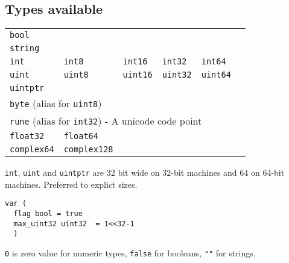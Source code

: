 \subsection{Types available}
\begin{tabular}{l l l l l l}
\multicolumn{6}{l}{\texttt{bool}} \\
\multicolumn{6}{l}{\texttt{string}} \\
\texttt{int} & \texttt{int8} & \texttt{int16} & \texttt{int32} & \texttt{int64} \\
\texttt{uint} & \texttt{uint8} & \texttt{uint16} & \texttt{uint32} & \texttt{uint64} \\
\multicolumn{6}{l}{\texttt{uintptr}} \\
\multicolumn{6}{l}{\texttt{byte} (alias for \texttt{uint8})} \\
\multicolumn{6}{l}{\texttt{rune} (alias for \texttt{int32}) - A unicode code point} \\
\texttt{float32} & \texttt{float64} \\
\texttt{complex64} & \texttt{complex128} \\
\end{tabular}

\texttt{int}, \texttt{uint} and \texttt{uintptr} are 32 bit wide on 32-bit machines and 64 on 64-bit machines. Preferred to explict sizes.

\begin{lstlisting}
var (
  flag bool = true
  max_uint32 uint32  = 1<<32-1 
  )
\end{lstlisting}

\texttt{0} is zero value for numeric types, \texttt{false} for booleans, \texttt{""} for strings.
